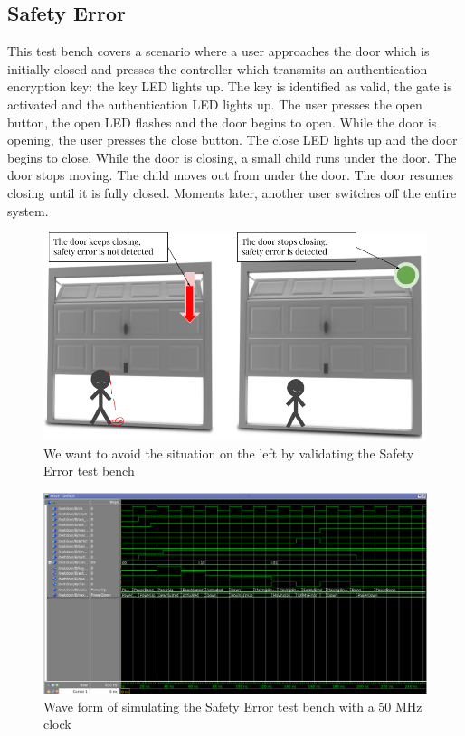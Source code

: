 \documentclass[a4paper,11pt]{article}
\begin{document}
	\subsection{Safety Error}
	
	\par This test bench covers a scenario where a user approaches the door which is initially closed and presses the controller which transmits an authentication encryption key: the key LED lights up. The key is identified as valid, the gate is activated and the authentication LED lights up. The user presses the open button, the open LED flashes and the door begins to open. While the door is opening, the user presses the close button. The close LED lights up and the door begins to close. While the door is closing, a small child runs under the door. The door stops moving. The child moves out from under the door. The door resumes closing until it is fully closed. Moments later, another user switches off the entire system.
    
    \begin{figure}[H]
      \centering
      \includegraphics[width=0.55\linewidth]{scenario1_maan.png}  
      \caption{We want to avoid the situation on the left by validating the Safety Error test bench}
    \end{figure}
    
    \begin{figure}[H]
      \centering
      \includegraphics[width=0.9\linewidth]{scenarioSafety.png}  
      \caption{Wave form of simulating the Safety Error test bench with a 50 MHz clock}
    \end{figure}
	
\end{document}
